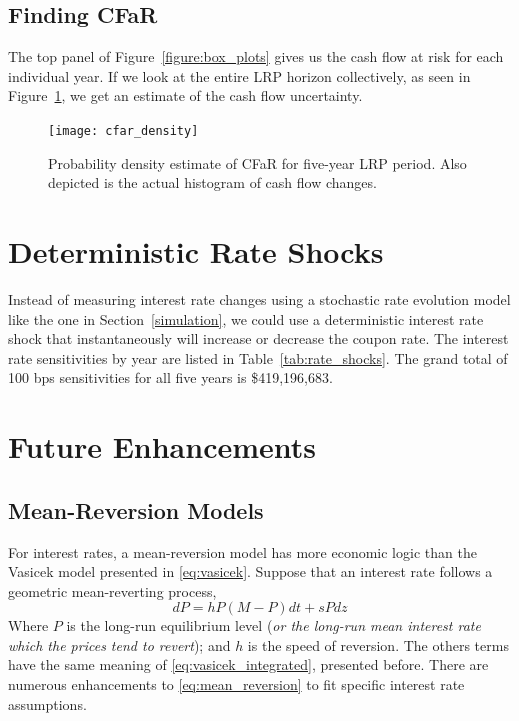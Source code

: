 \documentclass[11pt,twoside]{article}
\numberwithin{equation}{section}
\begin{document}
\subsection{Finding CFaR}
The top panel of Figure~\ref{figure:box_plots} gives us the cash flow at risk for each individual year. If we look at the entire LRP horizon collectively, as seen in Figure~\ref{figure:cfar_density}, we get an estimate of the cash flow uncertainty.
\begin{figure}[t]
  \centering
  \texttt{[image: cfar\_density]}
  \caption{Probability density estimate of CFaR for five-year LRP period. Also depicted is the actual histogram of cash flow changes.}
  \label{figure:cfar_density}
\end{figure}

\section{Deterministic Rate Shocks}
Instead of measuring interest rate changes using a stochastic rate evolution model like the one in Section~\ref{simulation}, we could use a deterministic interest rate shock that instantaneously will increase or decrease the coupon rate. The interest rate sensitivities by year are listed in Table~\ref{tab:rate_shocks}. The grand total of 100 bps sensitivities for all five years is \$419,196,683.



\section{Future Enhancements}
\subsection{Mean-Reversion Models}
For interest rates, a mean-reversion model has more economic logic than the Vasicek model presented in \eqref{eq:vasicek}.
Suppose that an interest rate follows a geometric mean-reverting process,
\begin{equation}
dP = h P (M -  P) dt + s P dz
\label{eq:mean_reversion}
\end{equation}
Where $P$ is the long-run equilibrium level (\emph{or the long-run mean interest rate which the prices tend to revert}); and $h$ is the speed of reversion. The others terms have the same meaning of \eqref{eq:vasicek_integrated}, presented before. There are numerous enhancements to \eqref{eq:mean_reversion} to fit specific interest rate assumptions.
\end{document}
